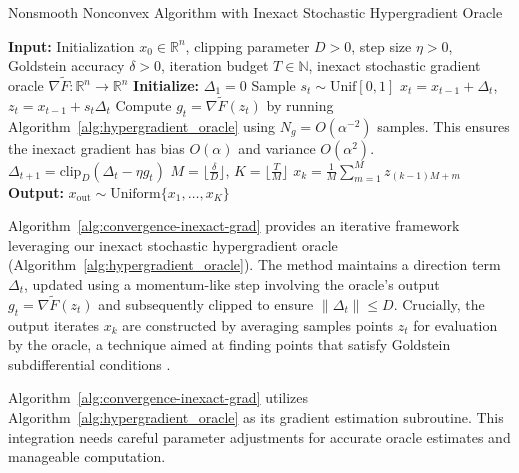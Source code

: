 \documentclass[letterpaper]{article} %
\newcommand{\1}{\mathbf{1}}
\begin{document}
\begin{algorithm}[h!]
\caption{Nonsmooth Nonconvex Algorithm with Inexact Stochastic Hypergradient Oracle}
\label{alg:convergence-inexact-grad}
\begin{algorithmic}[1]
\STATE \textbf{Input:} Initialization $x_0 \in \mathbb{R}^n$, clipping parameter $D > 0$, step size $\eta > 0$, Goldstein accuracy $\delta > 0$, iteration budget $T \in \mathbb{N}$, inexact stochastic gradient oracle $\nabla\tilde{F}: \mathbb{R}^n \to \mathbb{R}^n$
\STATE \textbf{Initialize:} $\Delta_1 = 0$
\STATE Sample $s_t \sim \text{Unif}[0, 1]$
\STATE $x_t = x_{t-1} + \Delta_t$, $z_t = x_{t-1} + s_t\Delta_t$
\STATE Compute $g_t = \nabla\tilde{F}(z_t)$ by running Algorithm~\ref{alg:hypergradient_oracle} using $N_g = O(\alpha^{-2})$ samples. This ensures the inexact gradient has bias $O(\alpha)$ and variance $O(\alpha^2)$. %
\STATE $\Delta_{t+1} = \text{clip}_D(\Delta_t - \eta g_t)$ 
\ENDFOR
\STATE $M = \lfloor\frac{\delta}{D}\rfloor$, $K = \lfloor\frac{T}{M}\rfloor$ 
\STATE $x_k = \frac{1}{M}\sum_{m=1}^{M} z_{(k-1)M+m}$
\ENDFOR
\STATE \textbf{Output:} $x_{\text{out}} \sim \text{Uniform}\{x_1, \ldots, x_K\}$
\end{algorithmic}
\end{algorithm}

Algorithm~\ref{alg:convergence-inexact-grad} provides an iterative framework leveraging our inexact stochastic hypergradient oracle (Algorithm~\ref{alg:hypergradient_oracle}). The method maintains a direction term $\Delta_t$, updated using a momentum-like step involving the oracle's output $g_t = \nabla\tilde{F}(z_t)$ and subsequently clipped to ensure $\|\Delta_t\| \le D$. Crucially, the output iterates $x_k$ are constructed by averaging samples points $z_t$ for evaluation by the oracle, a technique aimed at finding points that satisfy Goldstein subdifferential conditions \cite{goldstein1977, zhang2020complexity, davis2019stochastic}.

\begin{remark}\label{rem:algorithm_relationship_nsn}
Algorithm~\ref{alg:convergence-inexact-grad} utilizes Algorithm~\ref{alg:hypergradient_oracle} as its gradient estimation subroutine. This integration needs careful parameter adjustments for accurate oracle estimates and manageable computation.
\end{remark}
\end{document}
